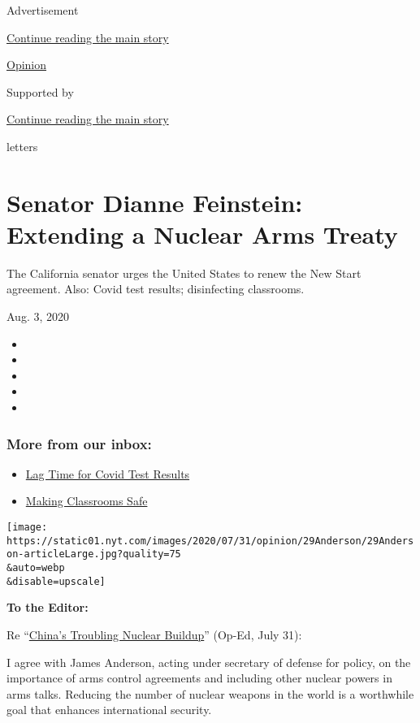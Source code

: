 Advertisement

\protect\hyperlink{after-top}{Continue reading the main story}

\href{/section/opinion}{Opinion}

Supported by

\protect\hyperlink{after-sponsor}{Continue reading the main story}

letters

\hypertarget{senator-dianne-feinstein-extending-a-nuclear-arms-treaty}{%
\section{Senator Dianne Feinstein: Extending a Nuclear Arms
Treaty}\label{senator-dianne-feinstein-extending-a-nuclear-arms-treaty}}

The California senator urges the United States to renew the New Start
agreement. Also: Covid test results; disinfecting classrooms.

Aug. 3, 2020

\begin{itemize}
\item
\item
\item
\item
\item
\end{itemize}

\hypertarget{more-from-our-inbox}{%
\subsubsection{More from our inbox:}\label{more-from-our-inbox}}

\begin{itemize}
\tightlist
\item
  \protect\hyperlink{link-8b8bdd5}{Lag Time for Covid Test Results}
\item
  \protect\hyperlink{link-7c46b27b}{Making Classrooms Safe}
\end{itemize}

\texttt{[image: https://static01.nyt.com/images/2020/07/31/opinion/29Anderson/29Anderson-articleLarge.jpg?quality=75\\\&auto=webp\\\&disable=upscale]}

\textbf{To the Editor:}

Re
``\href{https://www.nytimes.com/2020/07/29/opinion/russia-china-nuclear-weapons.html}{China's
Troubling Nuclear Buildup}'' (Op-Ed, July 31):

I agree with James Anderson, acting under secretary of defense for
policy, on the importance of arms control agreements and including other
nuclear powers in arms talks. Reducing the number of nuclear weapons in
the world is a worthwhile goal that enhances international security.

